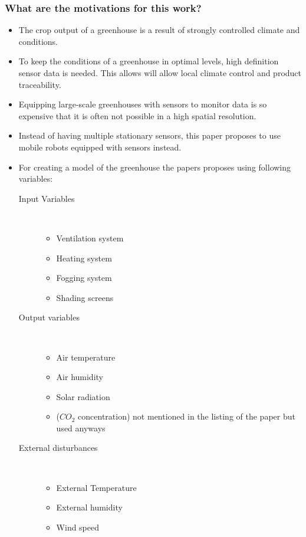 \subsubsection*{What are the motivations for this work?}
\begin{itemize} 
    \item The crop output of a greenhouse is a result of strongly controlled climate and conditions. 
    \item To keep the conditions of a greenhouse in optimal levels, high definition sensor data is needed. This allows will allow local climate control and product traceability.
    \item Equipping large-scale greenhouses with sensors to monitor data is so expensive that it is often not possible in a high spatial resolution.
    \item Instead of having multiple stationary sensors, this paper proposes to use mobile robots equipped with sensors instead.
    \item For creating a model of the greenhouse the papers proposes using following variables:\begin{description}
        \item[Input Variables]  \ 
        \begin{itemize}
            \item Ventilation system
            \item Heating system
            \item Fogging system
            \item Shading screens
        \end{itemize}
        \item[Output variables]   \ 
        \begin{itemize}
            \item Air temperature
            \item Air humidity
            \item Solar radiation
            \item ($CO_2$ concentration) not mentioned in the listing of the paper but used anyways
        \end{itemize}
        \item[External disturbances]\ 
        \begin{itemize}
            \item External Temperature
            \item External humidity
            \item Wind speed

\end{itemize}
\end{description}
\end{itemize}
